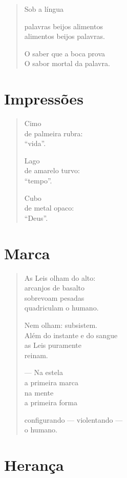 \begin{verse}
Sob a língua

palavras beijos alimentos\\
alimentos beijos palavras.

O saber que a boca prova\\
O sabor mortal da palavra.
\end{verse}

\chapter{Impressões}

\begin{verse}
Cimo\\
de palmeira rubra:\\
\quad\quad\quad{}``vida''.

Lago\\
de amarelo turvo:\\
\quad\quad\quad{}``tempo''.

Cubo\\
de metal opaco:\\
\quad\quad\quad``Deus''.
\end{verse}

\chapter{Marca}

\begin{verse}
As Leis olham do alto:\\
arcanjos de basalto\\
sobrevoam pesadas\\
quadriculam o humano.

Nem olham: subsistem.\\
Além do instante e do sangue\\
as Leis puramente\\
\hfill{}reinam.

--- Na estela\\
\quad{}a primeira marca\\
\quad{}na mente\\
\quad{}a primeira forma

configurando --- violentando ---\\
\quad\quad\quad{}o humano.
\end{verse}

\chapter{Herança}

